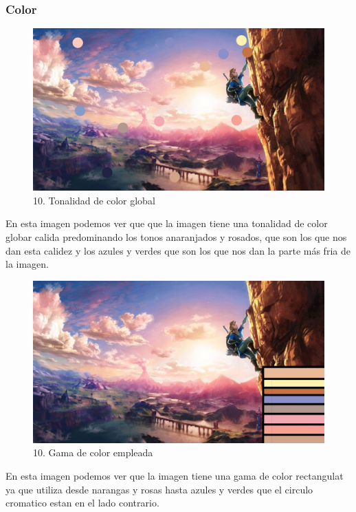 \documentclass[12pt]{article}
\begin{document}
        \subsubsection{Color}
        \begin{figure}[H]
          \centering
          \includegraphics[scale=0.35]{images/Selena/10_concept_art color.jpg}
          \caption{\small 10. Tonalidad de color global}
        \end{figure}
        En esta imagen podemos ver que que la imagen tiene una tonalidad de color globar calida predominando los tonos anaranjados y rosados, que son los que nos dan esta calidez y los azules y verdes que son los que nos dan la parte más fria de la imagen.  
        \begin{figure}[H]
          \centering
          \includegraphics[scale=0.35]{images/Selena/10_concept_art paleta.jpg}
          \caption{\small 10. Gama de color empleada}
        \end{figure}
        En esta imagen podemos ver que la imagen tiene una gama de color rectangulat ya que utiliza desde narangas y rosas hasta azules y verdes que el circulo cromatico estan en el lado contrario. 
\end{document}
